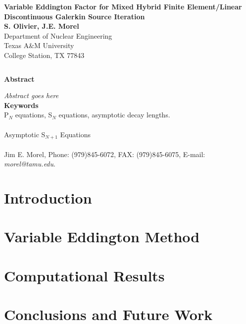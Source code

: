 \documentclass[12pt]{article}
\date{}
\newcommand{\bc}{\begin{center}}
\newcommand{\ec}{\end{center}}
\newcommand{\ess}{\doublespacing}
\begin{document}
%

\thispagestyle{empty}
\bc
{\Large \bf Variable Eddington Factor for Mixed Hybrid Finite Element/Linear Discontinuous Galerkin Source Iteration}\\
\vspace{0.5in}
{\large {\bf S. Olivier, J.E. Morel}\\
$ $\\
Department of Nuclear Engineering\\
Texas A\&M University\\
College Station, TX 77843}\\
\ec
$ $\\
\bc
{\large \bf Abstract}\\
\ec
\noindent
\emph{
Abstract goes here
}\\
$ $\\
\noindent
{\bf Keywords}\\
\noindent P$_N$ equations, S$_N$ equations, asymptotic decay lengths.\\
$ $\\
\\
\noindent Asymptotic S$_{N+1}$ Equations\\
$ $\\
\\
\noindent Jim E. Morel, Phone: (979)845-6072, FAX: (979)845-6075, E-mail: \emph{morel@tamu.edu}.
$ $\\
\newpage
\ess

\section{Introduction}


\section{Variable Eddington Method}


\section{Computational Results}


\section{Conclusions and Future Work}
\end{document}
